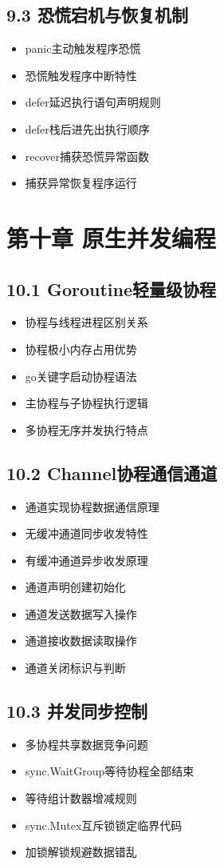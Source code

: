 \subsection{9.3 恐慌宕机与恢复机制}
\begin{itemize}
\item panic主动触发程序恐慌
\item 恐慌触发程序中断特性
\item defer延迟执行语句声明规则
\item defer栈后进先出执行顺序
\item recover捕获恐慌异常函数
\item 捕获异常恢复程序运行
\end{itemize}

\section{第十章 原生并发编程}
\subsection{10.1 Goroutine轻量级协程}
\begin{itemize}
\item 协程与线程进程区别关系
\item 协程极小内存占用优势
\item go关键字启动协程语法
\item 主协程与子协程执行逻辑
\item 多协程无序并发执行特点
\end{itemize}

\subsection{10.2 Channel协程通信通道}
\begin{itemize}
\item 通道实现协程数据通信原理
\item 无缓冲通道同步收发特性
\item 有缓冲通道异步收发原理
\item 通道声明创建初始化
\item 通道发送数据写入操作
\item 通道接收数据读取操作
\item 通道关闭标识与判断
\end{itemize}

\subsection{10.3 并发同步控制}
\begin{itemize}
\item 多协程共享数据竞争问题
\item sync.WaitGroup等待协程全部结束
\item 等待组计数器增减规则
\item sync.Mutex互斥锁锁定临界代码
\item 加锁解锁规避数据错乱
\end{itemize}

